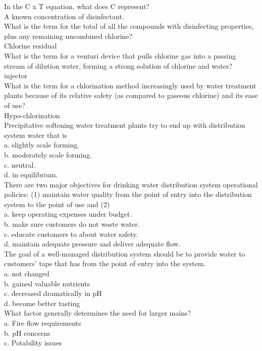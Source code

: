 In the C x T equation, what does C represent?\\
A known concentration of disinfectant.\\
What is the term for the total of all the compounds with disinfecting properties, plus any remaining uncombined chlorine?\\
Chlorine residual\\
What is the term for a venturi device that pulls chlorine gas into a passing stream of dilution water, forming a strong solution of chlorine and water?\\
injector\\
What is the term for a chlorination method increasingly used by water treatment plants because of its relative safety (as compared to gaseous chlorine) and its ease of use?\\
Hypo-chlorination\\
Precipitative softening water treatment plants try to end up with distribution system water that is\\
a.	slightly scale forming.\\
b.	moderately scale forming.\\
c.	neutral.\\
d.	in equilibrium.\\
There are two major objectives for drinking water distribution system operational policies: (1) maintain water quality from the point of entry into the distribution system to the point of use and (2)\\
a.	keep operating expenses under budget.\\
b.	make sure customers do not waste water.\\
c.	educate customers to about water safety.\\
d.	maintain adequate pressure and deliver adequate flow.\\
The goal of a well-managed distribution system should be to provide water to customers' taps that has from the point of entry into the system.\\
a.	not changed\\
b.	gained valuable nutrients\\
c.	decreased dramatically in pH\\
d.	become better tasting\\
What factor generally determines the need for larger mains?\\
a.	Fire flow requirements\\
b.	pH concerns\\
c.	Potability issues\\
